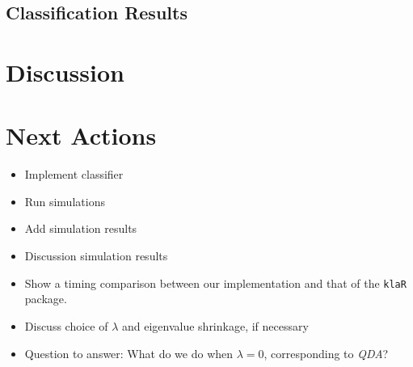 \documentclass[11pt]{article}
\begin{document}
\subsection{Classification Results}


\section{Discussion}


\section{Next Actions}

\begin{itemize}
\item Implement classifier
\item Run simulations
\item Add simulation results
\item Discussion simulation results
\item Show a timing comparison between our implementation and that of the {\tt klaR} package.
\item Discuss choice of $\lambda$ and eigenvalue shrinkage, if necessary
\item Question to answer: What do we do when $\lambda = 0$, corresponding to \emph{QDA}?
\end{itemize}

	



\end{document}
